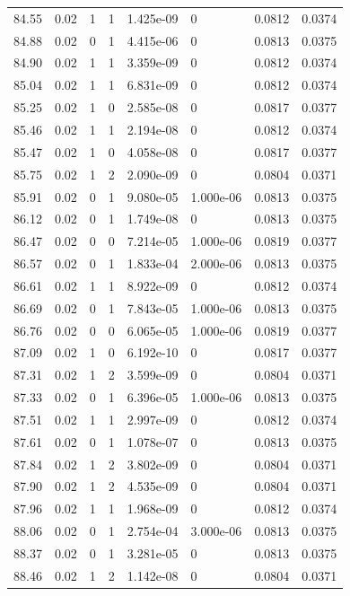 \documentclass[preview]{standalone}
\begin{document}
{{{{{{{{{{{{{\begin{tabular}{L{1.2cm}C{1.2cm} C{0.3cm}C{0.5cm} C{1.4cm}C{1.4cm} C{1.4cm}C{1.4cm}}
  84.55  &  0.02  & 1     &  1 &  1.425e-09  & 0  & 0.0812 &  0.0374   \\ 
  84.88  &  0.02  & 0     &  1 &  4.415e-06  & 0  & 0.0813 &  0.0375   \\ 
  84.90  &  0.02  & 1     &  1 &  3.359e-09  & 0  & 0.0812 &  0.0374   \\ 
  85.04  &  0.02  & 1     &  1 &  6.831e-09  & 0  & 0.0812 &  0.0374   \\ 
  85.25  &  0.02  & 1     &  0 &  2.585e-08  & 0  & 0.0817 &  0.0377   \\ 
  85.46  &  0.02  & 1     &  1 &  2.194e-08  & 0  & 0.0812 &  0.0374   \\ 
  85.47  &  0.02  & 1     &  0 &  4.058e-08  & 0  & 0.0817 &  0.0377   \\ 
  85.75  &  0.02  & 1     &  2 &  2.090e-09  & 0  & 0.0804 &  0.0371   \\ 
  85.91  &  0.02  & 0     &  1 &  9.080e-05  & 1.000e-06  & 0.0813 &  0.0375   \\ 
  86.12  &  0.02  & 0     &  1 &  1.749e-08  & 0  & 0.0813 &  0.0375   \\ 
  86.47  &  0.02  & 0     &  0 &  7.214e-05  & 1.000e-06  & 0.0819 &  0.0377   \\ 
  86.57  &  0.02  & 0     &  1 &  1.833e-04  & 2.000e-06  & 0.0813 &  0.0375   \\ 
  86.61  &  0.02  & 1     &  1 &  8.922e-09  & 0  & 0.0812 &  0.0374   \\ 
  86.69  &  0.02  & 0     &  1 &  7.843e-05  & 1.000e-06  & 0.0813 &  0.0375   \\ 
  86.76  &  0.02  & 0     &  0 &  6.065e-05  & 1.000e-06  & 0.0819 &  0.0377   \\ 
  87.09  &  0.02  & 1     &  0 &  6.192e-10  & 0  & 0.0817 &  0.0377   \\ 
  87.31  &  0.02  & 1     &  2 &  3.599e-09  & 0  & 0.0804 &  0.0371   \\ 
  87.33  &  0.02  & 0     &  1 &  6.396e-05  & 1.000e-06  & 0.0813 &  0.0375   \\ 
  87.51  &  0.02  & 1     &  1 &  2.997e-09  & 0  & 0.0812 &  0.0374   \\ 
  87.61  &  0.02  & 0     &  1 &  1.078e-07  & 0  & 0.0813 &  0.0375   \\ 
  87.84  &  0.02  & 1     &  2 &  3.802e-09  & 0  & 0.0804 &  0.0371   \\ 
  87.90  &  0.02  & 1     &  2 &  4.535e-09  & 0  & 0.0804 &  0.0371   \\ 
  87.96  &  0.02  & 1     &  1 &  1.968e-09  & 0  & 0.0812 &  0.0374   \\ 
  88.06  &  0.02  & 0     &  1 &  2.754e-04  & 3.000e-06  & 0.0813 &  0.0375   \\ 
  88.37  &  0.02  & 0     &  1 &  3.281e-05  & 0  & 0.0813 &  0.0375   \\ 
  88.46  &  0.02  & 1     &  2 &  1.142e-08  & 0  & 0.0804 &  0.0371   \\ 
\hline 
\end{tabular} 

}}}}}}}}}}}}}
\end{document}
